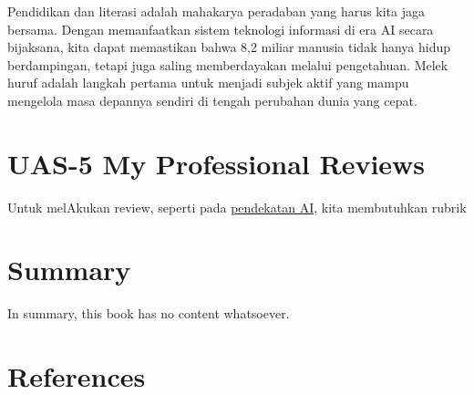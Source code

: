 \documentclass[
  letterpaper,
  DIV=11,
  numbers=noendperiod]{scrreprt}
\begin{document}
Pendidikan dan literasi adalah mahakarya peradaban yang harus kita jaga
bersama. Dengan memanfaatkan sistem teknologi informasi di era AI secara
bijaksana, kita dapat memastikan bahwa 8,2 miliar manusia tidak hanya
hidup berdampingan, tetapi juga saling memberdayakan melalui
pengetahuan. Melek huruf adalah langkah pertama untuk menjadi subjek
aktif yang mampu mengelola masa depannya sendiri di tengah perubahan
dunia yang cepat.


\chapter{UAS-5 My Professional
Reviews}\label{uas-5-my-professional-reviews}

Untuk melAkukan review, seperti pada
\href{../My_Personal_Reviews/Doc.5.Mengevaluasi-Esai-Berdasarkan-Rubrik.pdf}{pendekatan
AI}, kita membutuhkan rubrik


\chapter{Summary}\label{summary}

In summary, this book has no content whatsoever.


\chapter*{References}\label{references}


\label{refs}
\end{document}
